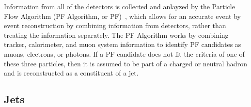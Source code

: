 Information from all of the detectors is collected and anlayzed by the Particle Flow Algorithm (PF Algorithm, or PF)~\cite{CMS-PAS-PFT-09-001}, which allows for an accurate event by event reconstruction by combining information from detectors, rather than treating the information separately. The PF Algorithm works by combining tracker, calorimeter, and muon system information to identify PF candidates as muons, electrons, or photons. If a PF candidate does not fit the criteria of one of these three particles, then it is assumed to be part of a charged or neutral hadron and is reconstructed as a constituent of a jet.
\vspace{5mm} 

\subsection{Jets}

